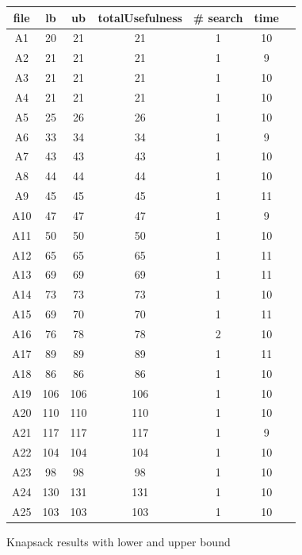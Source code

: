 \documentclass[a4paper ,12pt,french]{article}
\begin{document}
\begin{figure}[!h]
\begin{tabular}{|c|c|c|c|c|c|c|}
\hline
file&lb&ub&totalUsefulness&\# search&time\\
\hline
\hline
A1&20&21&21&1&10\\ \hline
A2&21&21&21&1&9\\ \hline
A3&21&21&21&1&10\\ \hline
A4&21&21&21&1&10\\ \hline
A5&25&26&26&1&10\\ \hline
A6&33&34&34&1&9\\ \hline
A7&43&43&43&1&10\\ \hline
A8&44&44&44&1&10\\ \hline
A9&45&45&45&1&11\\ \hline
A10&47&47&47&1&9\\ \hline
A11&50&50&50&1&10\\ \hline
A12&65&65&65&1&11\\ \hline
A13&69&69&69&1&11\\ \hline
A14&73&73&73&1&10\\ \hline
A15&69&70&70&1&11\\ \hline
A16&76&78&78&2&10\\ \hline
A17&89&89&89&1&11\\ \hline
A18&86&86&86&1&10\\ \hline
A19&106&106&106&1&10\\ \hline
A20&110&110&110&1&10\\ \hline
A21&117&117&117&1&9\\ \hline
A22&104&104&104&1&10\\ \hline
A23&98&98&98&1&10\\ \hline
A24&130&131&131&1&10\\ \hline
A25&103&103&103&1&10\\ \hline
\end{tabular}
\caption{Knapsack results with lower and upper bound}
\label{LUA}
\end{figure}
\end{document}

